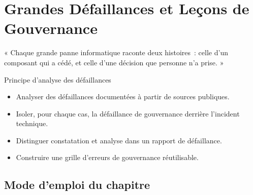 
\chapter{Grandes Défaillances et Leçons de Gouvernance}
\label{chap:defaillances}

\epigraph{%
    « Chaque grande panne informatique raconte deux histoires~: celle d'un
    composant qui a cédé, et celle d'une décision que personne n'a
    prise. »%
}{Principe d'analyse des défaillances}


\begin{boxobjectifs}
\begin{itemize}
    \item Analyser des défaillances documentées à partir de sources
          publiques.
    \item Isoler, pour chaque cas, la défaillance de gouvernance derrière
          l'incident technique.
    \item Distinguer constatation et analyse dans un rapport de défaillance.
    \item Construire une grille d'erreurs de gouvernance réutilisable.
\end{itemize}
\end{boxobjectifs}

\bigskip

\section*{Mode d'emploi du chapitre}

